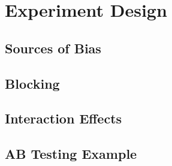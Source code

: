 \section{Experiment Design}
\label{hypo:experiment}

\subsection{Sources of Bias}
\label{hypo:experiment:bias}

\subsection{Blocking}
\label{hypo:experiment:blocking}

\subsection{Interaction Effects}
\label{hypo:experiment:interaction}

\subsection{AB Testing Example}
\label{hypo:experiment:AB}
